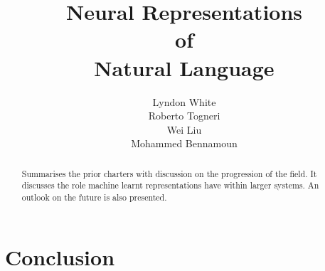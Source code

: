 \documentclass[12pt,parskip]{komatufte}
\begin{document}
\title{Neural Representations \\of\\ Natural Language}
\author{Lyndon White\\ Roberto Togneri\\ Wei Liu\\ Mohammed Bennamoun}
\publishers{SpringerBriefs in Computer Science}


\maketitle

\tableofcontents













\chapter{Conclusion}\label{sec:conclusion}
\begin{abstract}
Summarises the prior charters with discussion on the progression of the field.
It discusses the role machine learnt representations have within larger systems.
An outlook on the future is also presented.
\end{abstract}


\clearpage
{}
\printbibliography
\end{document}
